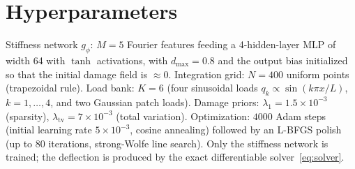 \documentclass[11pt]{article}
\begin{document}
\section{Hyperparameters}\label{app:hyper}
Stiffness network $g_\phi$: $M{=}5$ Fourier features feeding a 4-hidden-layer MLP
of width 64 with $\tanh$ activations, with $d_{\max}{=}0.8$ and the output bias
initialized so that the initial damage field is $\approx 0$. Integration grid:
$N{=}400$ uniform points (trapezoidal rule). Load bank: $K{=}6$ (four sinusoidal
loads $q_k\!\propto\!\sin(k\pi x/L)$, $k{=}1,\dots,4$, and two Gaussian patch
loads). Damage priors: $\lambda_1{=}1.5\times10^{-3}$ (sparsity),
$\lambda_{\mathrm{tv}}{=}7\times10^{-3}$ (total variation). Optimization:
$4000$ Adam steps (initial learning rate $5\times10^{-3}$, cosine annealing)
followed by an L-BFGS polish (up to $80$ iterations, strong-Wolfe line search).
Only the stiffness network is trained; the deflection is produced by the exact
differentiable solver~\eqref{eq:solver}.
\end{document}
